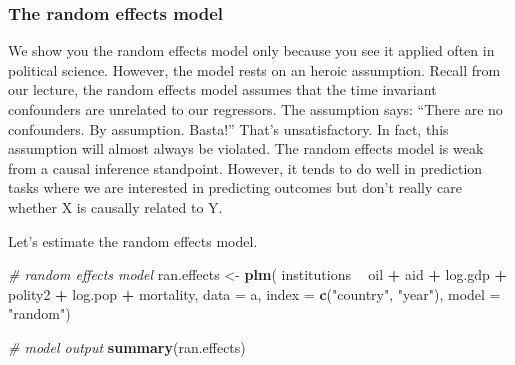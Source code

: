 \documentclass[]{article}
\newenvironment{Shaded}{\begin{snugshade}}{\end{snugshade}}
\newcommand{\KeywordTok}[1]{\textcolor[rgb]{0.13,0.29,0.53}{\textbf{#1}}}
\newcommand{\DataTypeTok}[1]{\textcolor[rgb]{0.13,0.29,0.53}{#1}}
\newcommand{\StringTok}[1]{\textcolor[rgb]{0.31,0.60,0.02}{#1}}
\newcommand{\CommentTok}[1]{\textcolor[rgb]{0.56,0.35,0.01}{\textit{#1}}}
\newcommand{\OperatorTok}[1]{\textcolor[rgb]{0.81,0.36,0.00}{\textbf{#1}}}
\newcommand{\NormalTok}[1]{#1}
\theoremstyle{definition}
\theoremstyle{definition}
\theoremstyle{definition}
\theoremstyle{remark}
\begin{document}
\subsubsection{The random effects model}\label{the-random-effects-model}

We show you the random effects model only because you see it applied
often in political science. However, the model rests on an heroic
assumption. Recall from our lecture, the random effects model assumes
that the time invariant confounders are unrelated to our regressors. The
assumption says: ``There are no confounders. By assumption. Basta!''
That's unsatisfactory. In fact, this assumption will almost always be
violated. The random effects model is weak from a causal inference
standpoint. However, it tends to do well in prediction tasks where we
are interested in predicting outcomes but don't really care whether X is
causally related to Y.

Let's estimate the random effects model.

\begin{Shaded}
\begin{Highlighting}[]
\CommentTok{# random effects model}
\NormalTok{ran.effects <-}\StringTok{ }\KeywordTok{plm}\NormalTok{(}
\NormalTok{  institutions }\OperatorTok{~}\StringTok{ }\NormalTok{oil }\OperatorTok{+}\StringTok{ }\NormalTok{aid }\OperatorTok{+}\StringTok{ }\NormalTok{log.gdp }\OperatorTok{+}\StringTok{ }\NormalTok{polity2 }\OperatorTok{+}\StringTok{ }\NormalTok{log.pop }\OperatorTok{+}\StringTok{ }\NormalTok{mortality,}
  \DataTypeTok{data =}\NormalTok{ a,}
  \DataTypeTok{index =} \KeywordTok{c}\NormalTok{(}\StringTok{"country"}\NormalTok{, }\StringTok{"year"}\NormalTok{),}
  \DataTypeTok{model =} \StringTok{"random"}\NormalTok{)}

\CommentTok{# model output}
\KeywordTok{summary}\NormalTok{(ran.effects)}
\end{Highlighting}
\end{Shaded}
\end{document}
